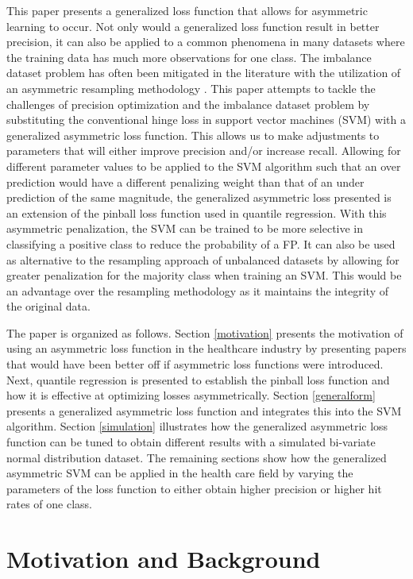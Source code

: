 \documentclass[twoside,11pt]{article}
\begin{document}
This paper presents a generalized loss function that allows for asymmetric learning to occur. Not only would a generalized loss function result in better precision, it can also be applied to a common phenomena in many datasets where the training data has much more observations for one class. The imbalance dataset problem has often been mitigated in the literature with the utilization of an asymmetric resampling methodology \citep{Hamed04}. This paper attempts to tackle the challenges of precision optimization and the imbalance dataset problem by substituting the conventional hinge loss in support vector machines (SVM) with a generalized asymmetric loss function. This allows us to make adjustments to parameters that will either improve precision and/or increase recall. Allowing for different parameter values to be applied to the SVM algorithm such that an over prediction would have a different penalizing weight than that of an under prediction of the same magnitude, the generalized asymmetric loss presented is an extension of the pinball loss function \citep{Steinwart07} used in quantile regression. With this asymmetric penalization, the SVM can be trained to be more selective in classifying a positive class to reduce the probability of a FP. It can also be used as alternative to the resampling approach of unbalanced datasets by allowing for greater penalization for the majority class when training an SVM. This would be an advantage over the resampling methodology as it maintains the integrity of the original data.

The paper is organized as follows. Section \ref{motivation} presents the motivation of using an asymmetric loss function in the healthcare industry by presenting papers that would have been better off if asymmetric loss functions were introduced. Next, quantile regression is presented to establish the pinball loss function and how it is effective at optimizing losses asymmetrically. Section \ref{generalform} presents a generalized asymmetric loss function and integrates this into the SVM algorithm. Section \ref{simulation} illustrates how the generalized asymmetric loss function can be tuned to obtain different results with a simulated bi-variate normal distribution dataset. The remaining sections show how the generalized asymmetric SVM can be applied in the health care field by varying the parameters of the loss function to either obtain higher precision or higher hit rates of one class.

\section{Motivation and Background}
\end{document}
